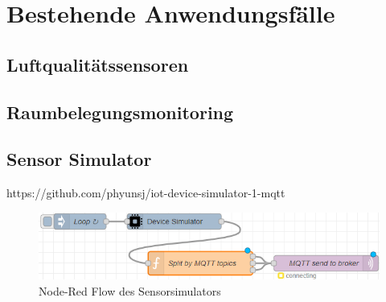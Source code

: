 \section{Bestehende Anwendungsfälle}

\subsection{Luftqualitätssensoren}

\subsection{Raumbelegungsmonitoring}

\subsection{Sensor Simulator}\label{chap:iotdevicesim}
https://github.com/phyunsj/iot-device-simulator-1-mqtt

\begin{figure}[H]
\centering
\includegraphics[width=\textwidth]{graphics/Device-Simulator-Flow.png}
\caption{Node-Red Flow des Sensorsimulators}
\label{abb:DeviceSimFlow}
\end{figure}


